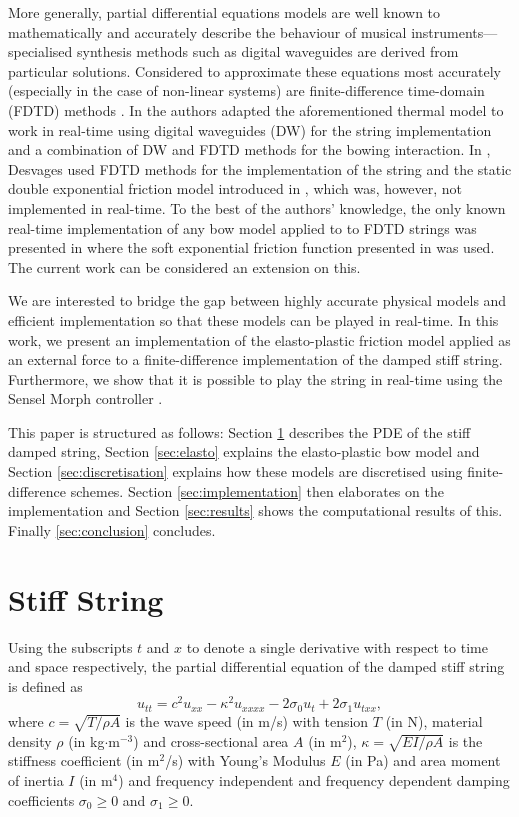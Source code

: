 \documentclass[twoside,a4paper]{article}
\begin{document}
More generally, partial differential equations models are well known to mathematically and accurately describe the behaviour of musical instruments---specialised synthesis methods such as digital waveguides are derived from particular solutions. Considered to approximate these equations most accurately (especially in the case of non-linear systems) are finite-difference time-domain (FDTD) methods \cite{Bilbao2009, Bilbao2018}. In \cite{Maestre2014} the authors adapted the aforementioned thermal model to work in real-time using digital waveguides (DW) for the string implementation and a combination of DW and FDTD methods for the bowing interaction. In \cite{Desvages2017}, Desvages used FDTD methods for the implementation of the string and the static double exponential friction model introduced in \cite{Smith2000}, which was, however, not implemented in real-time. To the best of the authors' knowledge, the only known real-time implementation of any bow model applied to to FDTD strings was presented in \cite{Willemsen2019} where the soft exponential friction function presented in \cite{Bilbao2009} was used. The current work can be considered an extension on this.

We are interested to bridge the gap between highly accurate physical models and efficient implementation so that these models can be played in real-time. In this work, we present an implementation of the elasto-plastic friction model applied as an external force to a finite-difference implementation of the damped stiff string. Furthermore, we show that it is possible to play the string in real-time using the Sensel Morph controller \cite{Sensel2019}.

This paper is structured as follows: Section \ref{sec:stiffString} describes the PDE of the stiff damped string, Section \ref{sec:elasto} explains the elasto-plastic bow model and Section \ref{sec:discretisation} explains how these models are discretised using finite-difference schemes. Section \ref{sec:implementation} then elaborates on the implementation and Section \ref{sec:results} shows the computational results of this. Finally \ref{sec:conclusion} concludes.

\section{Stiff String}\label{sec:stiffString}
Using the subscripts $t$ and $x$ to denote a single derivative with respect to time and space respectively, the partial differential equation of the damped stiff string is defined as \cite{Bilbao2009}
\begin{equation}\label{eq:PDE}
    u_{tt} = c^2u_{xx}-\kappa^2u_{xxxx}-2\sigma_0u_t+2\sigma_1u_{txx},
\end{equation}
where $c = \sqrt{T/\rho A}$ is the wave speed (in m/s) with tension $T$ (in N), material density $\rho$ (in kg$\cdot$m$^{-3}$) and cross-sectional area $A$ (in m$^2$), $\kappa = \sqrt{EI/\rho A}$ is the stiffness coefficient (in m$^2$/s) with Young's Modulus $E$ (in Pa) and area moment of inertia $I$ (in m$^4$) and frequency independent and frequency dependent damping coefficients $\sigma_0 \geq 0$ and $\sigma_1 \geq 0$.
\end{document}
